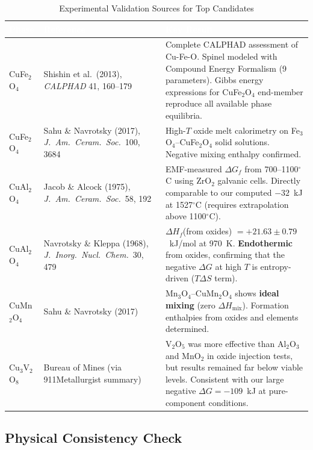 \documentclass[11pt]{article}
\begin{document}
\begin{table}[H]
\caption{Experimental Validation Sources for Top Candidates}
\label{tab:litcheck}
\centering
\renewcommand{\arraystretch}{1.3}
\setlength{\arrayrulewidth}{0.8pt}
\small
\begin{tabular}{|>{\raggedright\arraybackslash}p{1.0in}|>{\raggedright\arraybackslash}p{1.8in}|>{\raggedright\arraybackslash}p{3.0in}|}
\hline
\rowcolor{headercolor}
\textcolor{white}{\textbf{Phase}} & \textcolor{white}{\textbf{Reference}} & \textcolor{white}{\textbf{Key Result}} \\
\hline
CuFe$_2$O$_4$ & Shishin et al.\ (2013), \textit{CALPHAD} 41, 160--179 & Complete CALPHAD assessment of Cu-Fe-O. Spinel modeled with Compound Energy Formalism (9 parameters). Gibbs energy expressions for CuFe$_2$O$_4$ end-member reproduce all available phase equilibria. \\
\hline
\rowcolor{altrow}
CuFe$_2$O$_4$ & Sahu \& Navrotsky (2017), \textit{J.\ Am.\ Ceram.\ Soc.}\ 100, 3684 & High-$T$ oxide melt calorimetry on Fe$_3$O$_4$--CuFe$_2$O$_4$ solid solutions. Negative mixing enthalpy confirmed. \\
\hline
CuAl$_2$O$_4$ & Jacob \& Alcock (1975), \textit{J.\ Am.\ Ceram.\ Soc.}\ 58, 192 & EMF-measured $\Delta G_f$ from 700--1100$^\circ$C using ZrO$_2$ galvanic cells. Directly comparable to our computed $-32$~kJ at 1527$^\circ$C (requires extrapolation above 1100$^\circ$C). \\
\hline
\rowcolor{altrow}
CuAl$_2$O$_4$ & Navrotsky \& Kleppa (1968), \textit{J.\ Inorg.\ Nucl.\ Chem.}\ 30, 479 & $\Delta H_f$(from oxides) $= +21.63 \pm 0.79$~kJ/mol at 970~K. \textbf{Endothermic} from oxides, confirming that the negative $\Delta G$ at high $T$ is entropy-driven ($T\Delta S$ term). \\
\hline
CuMn$_2$O$_4$ & Sahu \& Navrotsky (2017) & Mn$_3$O$_4$--CuMn$_2$O$_4$ shows \textbf{ideal mixing} (zero $\Delta H_{\text{mix}}$). Formation enthalpies from oxides and elements determined. \\
\hline
\rowcolor{altrow}
Cu$_3$V$_2$O$_8$ & Bureau of Mines (via 911Metallurgist summary) & V$_2$O$_5$ was more effective than Al$_2$O$_3$ and MnO$_2$ in oxide injection tests, but results remained far below viable levels. Consistent with our large negative $\Delta G = -109$~kJ at pure-component conditions. \\
\hline
\end{tabular}
\end{table}

\subsection{Physical Consistency Check}
\end{document}
